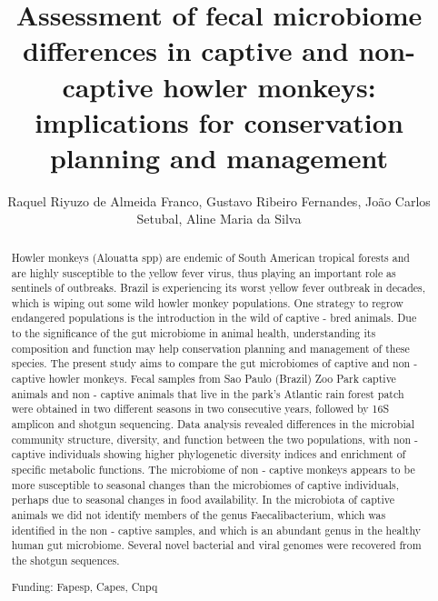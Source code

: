 \documentclass[twoside]{article}
\title{\vspace{-15mm}\fontsize{24pt}{10pt}\selectfont\textbf{ Assessment of fecal microbiome differences in captive and non-captive howler monkeys: implications for conservation planning and management }} %
\author{ Raquel Riyuzo de Almeida Franco, Gustavo Ribeiro Fernandes, Jo\~ao Carlos Setubal, Aline Maria da Silva }
\affil{ Universidade de Sao Paulo }
\date{}
\begin{document}
  
  
  \maketitle %
  
  
  \thispagestyle{fancy} %
  
  
  \begin{abstract}
  Howler monkeys (Alouatta spp) are endemic of South American tropical forests and are highly susceptible to the yellow fever virus,  thus playing an important role as sentinels of outbreaks. Brazil is experiencing its worst yellow fever outbreak in decades,  which is wiping out some wild howler monkey populations. One strategy to regrow endangered populations is the introduction in the wild of captive - bred animals. Due to the significance of the gut microbiome in animal health,  understanding its composition and function may help conservation planning and management of these species. The present study aims to compare the gut microbiomes of captive and non - captive howler monkeys. Fecal samples from Sao Paulo (Brazil) Zoo Park captive animals and non - captive animals that live in the park’s Atlantic rain forest patch were obtained in two different seasons in two consecutive years,  followed by 16S amplicon and shotgun sequencing. Data analysis revealed differences in the microbial community structure,  diversity,  and function between the two populations,  with non - captive individuals showing higher phylogenetic diversity indices and enrichment of specific metabolic functions. The microbiome of non - captive monkeys appears to be more susceptible to seasonal changes than the microbiomes of captive individuals,  perhaps due to seasonal changes in food availability. In the microbiota of captive animals we did not identify members of the genus Faecalibacterium,  which was identified in the non - captive samples,  and which is an abundant genus in the healthy human gut microbiome. Several novel bacterial and viral genomes were recovered from the shotgun sequences.
  
  Funding: Fapesp,  Capes,  Cnpq \\ 
  \end{abstract}
  
\end{document}
